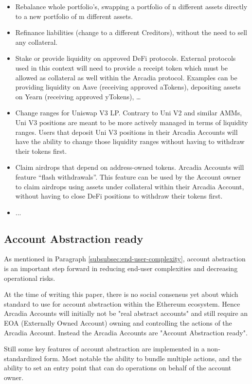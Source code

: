 \documentclass[sigconf,nonacm]{acmart}
\begin{document}
\begin{itemize}
    \item Rebalance whole portfolio's, swapping a portfolio of n different assets directly to a new portfolio of m different assets.
    \item Refinance liabilities (change to a different Creditors), without the need to sell any collateral.
    \item Stake or provide liquidity on approved DeFi protocols.
    External protocols used in this context will need to provide a receipt token which must be allowed as collateral as well within the Arcadia protocol.
    Examples can be providing liquidity on Aave (receiving approved aTokens), depositing assets on Yearn (receiving approved yTokens), …
    \item Change ranges for Uniswap V3 LP. Contrary to Uni V2 and similar AMMs, Uni V3 positions are meant to be more actively managed in terms of liquidity ranges.
    Users that deposit Uni V3 positions in their Arcadia Accounts will have the ability to change those liquidity ranges without having to withdraw their tokens first.
    \item Claim airdrops that depend on address-owned tokens. Arcadia Accounts will feature “flash withdrawals”.
    This feature can be used by the Account owner to claim airdrops using assets under collateral within their Arcadia Account, without having to close DeFi positions to withdraw their tokens first.
    \item ...
\end{itemize}

\subsection{Account Abstraction ready}
\label{subsec:account-abstraction-ready}
As mentioned in Paragraph \ref{subsubsec:end-user-complexity}, account abstraction is an important step forward in reducing end-user complexities and decreasing operational risks.

At the time of writing this paper, there is no social consensus yet about which standard to use for account abstraction within the Ethereum ecosystem.
Hence Arcadia Accounts will initially not be "real abstract accounts" and still require an EOA (Externally Owned Account) owning and controlling the actions of the Arcadia Account.
Instead the Arcadia Accounts are "Account Abstraction ready".

Still some key features of account abstraction are implemented in a non-standardized form.
Most notable the ability to bundle multiple actions, and the ability to set an entry point that can do operations on behalf of the account owner.
\end{document}
